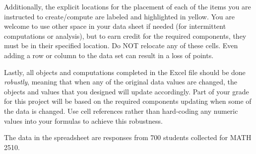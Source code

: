 \documentclass{article}
\begin{document}
Additionally, the explicit locations for the placement of each of the items you are instructed to create/compute are labeled and highlighted in yellow. You are welcome to use other space in your data sheet if needed (for intermittent computations or analysis), but to earn credit for the required components, they must be in their specified location. Do NOT relocate any of these cells. Even adding a row or column to the data set can result in a loss of points.

Lastly, all objects and computations completed in the Excel file should be done {\em robustly}, meaning that when any of the original data values are changed, the objects and values that you designed will update accordingly. Part of your grade for this project will be based on the required components updating when some of the data is changed. Use cell references rather than hard-coding any numeric values into your formulas to achieve this robustness.

\newpage
The data in the spreadsheet are responses from 700 students collected for MATH 2510.
\end{document}
